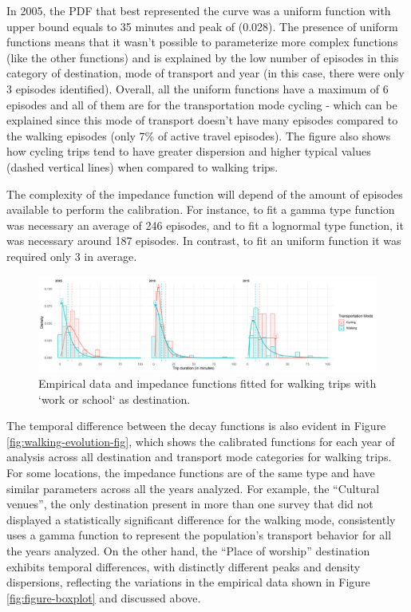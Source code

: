 \documentclass[preprint, 3p,
authoryear]{elsarticle} %
\begin{document}
In 2005, the PDF that best represented the curve was a uniform function
with upper bound equals to 35 minutes and peak of (0.028). The presence
of uniform functions means that it wasn't possible to parameterize more
complex functions (like the other functions) and is explained by the low
number of episodes in this category of destination, mode of transport
and year (in this case, there were only 3 episodes identified). Overall,
all the uniform functions have a maximum of 6 episodes and all of them
are for the transportation mode cycling - which can be explained since
this mode of transport doesn't have many episodes compared to the
walking episodes (only 7\% of active travel episodes). The figure also
shows how cycling trips tend to have greater dispersion and higher
typical values (dashed vertical lines) when compared to walking trips.

The complexity of the impedance function will depend of the amount of
episodes available to perform the calibration. For instance, to fit a
gamma type function was necessary an average of 246 episodes, and to fit
a lognormal type function, it was necessary around 187 episodes. In
contrast, to fit an uniform function it was required only 3 in average.

\begin{figure}

{\centering \includegraphics[width=1\linewidth]{figures/impf_Outdoors} 

}

\caption{Empirical data and impedance functions fitted for walking trips with `work or school` as destination.}\label{fig:outdoors-impedance-fig}
\end{figure}

The temporal difference between the decay functions is also evident in
Figure \ref{fig:walking-evolution-fig}, which shows the calibrated
functions for each year of analysis across all destination and transport
mode categories for walking trips. For some locations, the impedance
functions are of the same type and have similar parameters across all
the years analyzed. For example, the ``Cultural venues'', the only
destination present in more than one survey that did not displayed a
statistically significant difference for the walking mode, consistently
uses a gamma function to represent the population's transport behavior
for all the years analyzed. On the other hand, the ``Place of worship''
destination exhibits temporal differences, with distinctly different
peaks and density dispersions, reflecting the variations in the
empirical data shown in Figure \ref{fig:figure-boxplot} and discussed
above.
\end{document}
